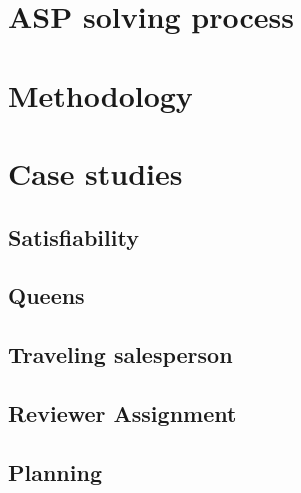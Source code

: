 \section{ASP solving process}
%


\section{Methodology}
%


\section{Case studies}
\subsection{Satisfiability}

\subsection{Queens}

\subsection{Traveling salesperson}

\subsection{Reviewer Assignment}

\subsection{Planning}

%
